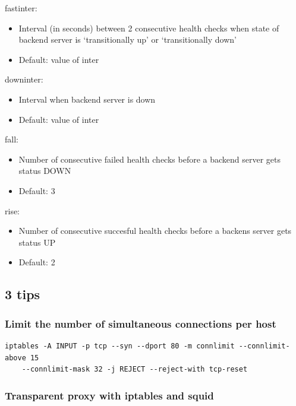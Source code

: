 \documentclass{article}
\begin{document}
fastinter:

\begin{itemize}
    \item Interval (in seconds) between 2 consecutive health checks when state of backend server is `transitionally up' or `transitionally down'
    \item Default: value of inter
\end{itemize}

downinter:

\begin{itemize}
    \item Interval when backend server is down
    \item Default: value of inter
\end{itemize}

fall:

\begin{itemize}
    \item Number of consecutive failed health checks before a backend server gets status DOWN
    \item Default: 3
\end{itemize}

rise:

\begin{itemize}
    \item Number of consecutive succesful health checks before a backens server gets status UP
    \item Default: 2
\end{itemize}

\subsection{3 tips}

\subsubsection{Limit the number of simultaneous connections per host}

\begin{verbatim}
iptables -A INPUT -p tcp --syn --dport 80 -m connlimit --connlimit-above 15 
    --connlimit-mask 32 -j REJECT --reject-with tcp-reset
\end{verbatim}

\subsubsection{Transparent proxy with iptables and squid}
\end{document}
